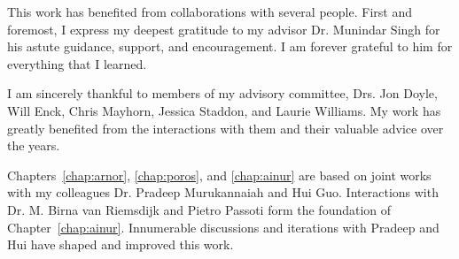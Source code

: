 \begin{acknowledgements}

This work has benefited from collaborations with several people.
First and foremost, I express my deepest gratitude to my advisor Dr. Munindar Singh for his astute guidance, support, and encouragement. 
I am forever grateful to him for everything that I learned. 

I am sincerely thankful to members of my advisory committee, Drs. Jon Doyle, Will Enck, Chris Mayhorn, Jessica Staddon, and Laurie Williams. 
My work has greatly benefited from the interactions with them and their valuable advice over the years. 

Chapters~\ref{chap:arnor}, \ref{chap:poros}, and \ref{chap:ainur} are based on joint
works with my colleagues Dr. Pradeep Murukannaiah and Hui Guo. 
Interactions with Dr. M. Birna van Riemsdijk and Pietro Passoti form the foundation of Chapter~\ref{chap:ainur}.
Innumerable discussions and iterations with Pradeep and Hui have shaped and improved this work. 


\end{acknowledgements}
